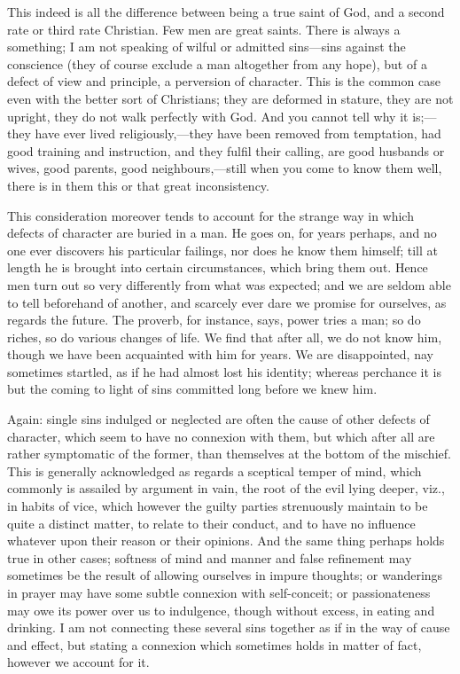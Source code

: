 This indeed is all the difference between being a true saint of
God, and a second rate or third rate Christian. Few men are great
saints. There is always a something; I am not speaking of wilful or
admitted sins—sins against the conscience (they of course exclude a
man altogether from any hope), but of a defect of view and principle,
a perversion of character. This is the common case even with the
better sort of Christians; they are deformed in stature, they are not
upright, they do not walk perfectly with God. And you cannot tell why
it is;—they have ever lived religiously,—they have been removed
from temptation, had good training and instruction, and they fulfil
their calling, are good husbands or wives, good parents, good
neighbours,—still when you come to know them well, there is in them
this or that great inconsistency.

This consideration moreover tends to account for the strange way in
which defects of character are buried in a man. He goes on, for years
perhaps, and no one ever discovers his particular failings, nor does
he know them himself; till at length he is brought into certain
circumstances, which bring them out. Hence men turn out so very
differently from what was expected; and we are seldom able to tell
beforehand of another, and scarcely ever dare we promise for
ourselves, as regards the future. The proverb, for instance, says,
power tries a man; so do riches, so do various changes of life. We
find that after all, we do not know him, though we have been
acquainted with him for years. We are disappointed, nay sometimes
startled, as if he had almost lost his identity; whereas perchance it
is but the coming to light of sins committed long before we knew him.

Again: single sins indulged or neglected are often the cause of
other defects of character, which seem to have no connexion with them,
but which after all are rather symptomatic of the former, than
themselves at the bottom of the mischief. This is generally
acknowledged as regards a sceptical temper of mind, which commonly is
assailed by argument in vain, the root of the evil lying deeper, viz.,
in habits of vice, which however the guilty parties strenuously
maintain to be quite a distinct matter, to relate to their conduct,
and to have no influence whatever upon their reason or their opinions.
And the same thing perhaps holds true in other cases; softness of mind
and manner and false refinement may sometimes be the result of
allowing ourselves in impure thoughts; or wanderings in prayer may
have some subtle connexion with self-conceit; or passionateness may
owe its power over us to indulgence, though without excess, in eating
and drinking. I am not connecting these several sins together as if in
the way of cause and effect, but stating a connexion which sometimes
holds in matter of fact, however we account for it.

